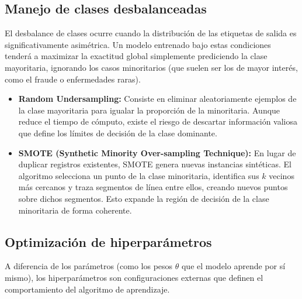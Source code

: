 \subsection{Manejo de clases desbalanceadas}
El desbalance de clases ocurre cuando la distribución de las etiquetas de salida es significativamente asimétrica. Un modelo entrenado bajo estas condiciones tenderá a maximizar la exactitud global simplemente prediciendo la clase mayoritaria, ignorando los casos minoritarios (que suelen ser los de mayor interés, como el fraude o enfermedades raras).

\begin{itemize}
\item \textbf{Random Undersampling:} Consiste en eliminar aleatoriamente ejemplos de la clase mayoritaria para igualar la proporción de la minoritaria. Aunque reduce el tiempo de cómputo, existe el riesgo de descartar información valiosa que define los límites de decisión de la clase dominante.
\item \textbf{SMOTE (Synthetic Minority Over-sampling Technique):} En lugar de duplicar registros existentes, SMOTE genera nuevas instancias sintéticas. El algoritmo selecciona un punto de la clase minoritaria, identifica sus $k$ vecinos más cercanos y traza segmentos de línea entre ellos, creando nuevos puntos sobre dichos segmentos. Esto expande la región de decisión de la clase minoritaria de forma coherente.

\end{itemize}

\subsection{Optimización de hiperparámetros}

A diferencia de los parámetros (como los pesos $\theta$ que el modelo aprende por sí mismo), los hiperparámetros son configuraciones externas que definen el comportamiento del algoritmo de aprendizaje.

